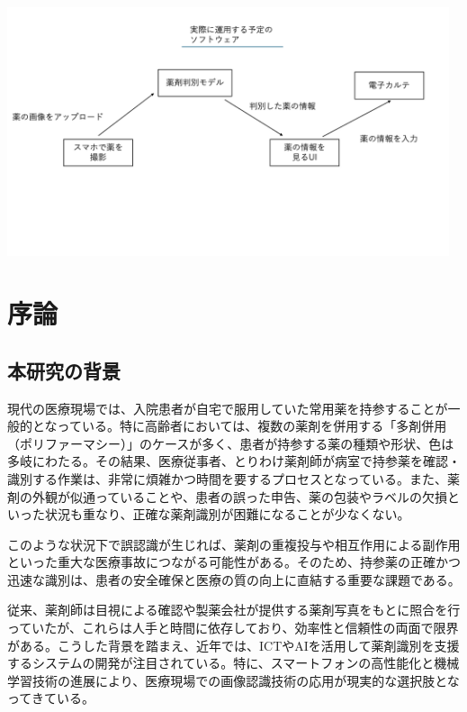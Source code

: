 \documentclass[12pt]{article}
\begin{document}
\begin{center}
  \includegraphics[width=13cm]{app_model_report.png}
\end{center}

\newpage

\tableofcontents
\newpage
\setcounter{page}{1}
\pagestyle{plain}

\section{序論}\label{sec1}
\subsection{本研究の背景}
現代の医療現場では、入院患者が自宅で服用していた常用薬を持参することが一般的となっている。特に高齢者においては、複数の薬剤を併用する「多剤併用（ポリファーマシー）」のケースが多く、患者が持参する薬の種類や形状、色は多岐にわたる。その結果、医療従事者、とりわけ薬剤師が病室で持参薬を確認・識別する作業は、非常に煩雑かつ時間を要するプロセスとなっている。また、薬剤の外観が似通っていることや、患者の誤った申告、薬の包装やラベルの欠損といった状況も重なり、正確な薬剤識別が困難になることが少なくない。

このような状況下で誤認識が生じれば、薬剤の重複投与や相互作用による副作用といった重大な医療事故につながる可能性がある。そのため、持参薬の正確かつ迅速な識別は、患者の安全確保と医療の質の向上に直結する重要な課題である。

従来、薬剤師は目視による確認や製薬会社が提供する薬剤写真をもとに照合を行っていたが、これらは人手と時間に依存しており、効率性と信頼性の両面で限界がある。こうした背景を踏まえ、近年では、ICTやAIを活用して薬剤識別を支援するシステムの開発が注目されている。特に、スマートフォンの高性能化と機械学習技術の進展により、医療現場での画像認識技術の応用が現実的な選択肢となってきている。
\end{document}
